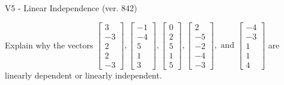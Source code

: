\begin{exercise}
  \begin{exerciseTitle}V5 - Linear Independence (ver. 842)\end{exerciseTitle}
  \begin{exerciseStatement}
    Explain why the vectors \(\left[\begin{array}{r}
3 \\
-3 \\
2 \\
2 \\
-3
\end{array}\right] , \left[\begin{array}{r}
-1 \\
-4 \\
5 \\
1 \\
3
\end{array}\right] , \left[\begin{array}{r}
0 \\
2 \\
5 \\
1 \\
5
\end{array}\right] , \left[\begin{array}{r}
2 \\
-5 \\
-2 \\
-4 \\
-3
\end{array}\right] , \text{ and } \left[\begin{array}{r}
-4 \\
-3 \\
1 \\
1 \\
4
\end{array}\right]\) are linearly dependent or linearly independent.	



\end{exerciseStatement}
\end{exercise}
